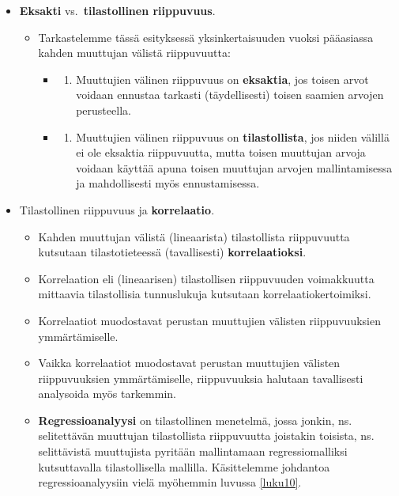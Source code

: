 \documentclass[
]{book}
\providecommand{\tightlist}{%
  \setlength{\itemsep}{0pt}\setlength{\parskip}{0pt}}
\begin{document}
\hfill\break

\begin{itemize}
\tightlist
\item
  \textbf{Eksakti} vs.~\textbf{tilastollinen riippuvuus}.

  \begin{itemize}
  \tightlist
  \item
    Tarkastelemme tässä esityksessä yksinkertaisuuden vuoksi pääasiassa kahden muuttujan välistä riippuvuutta:

    \begin{itemize}
    \item
      \begin{enumerate}
      \def\labelenumi{(\roman{enumi})}
      \tightlist
      \item
        Muuttujien välinen riippuvuus on \textbf{eksaktia}, jos toisen arvot voidaan ennustaa tarkasti (täydellisesti) toisen saamien arvojen perusteella.
      \end{enumerate}
    \item
      \begin{enumerate}
      \def\labelenumi{(\roman{enumi})}
      \setcounter{enumi}{1}
      \tightlist
      \item
        Muuttujien välinen riippuvuus on \textbf{tilastollista}, jos niiden välillä ei ole eksaktia riippuvuutta, mutta toisen muuttujan arvoja voidaan käyttää apuna toisen muuttujan arvojen mallintamisessa ja mahdollisesti myös ennustamisessa.
      \end{enumerate}
    \end{itemize}
  \end{itemize}
\item
  Tilastollinen riippuvuus ja \textbf{korrelaatio}.

  \begin{itemize}
  \tightlist
  \item
    Kahden muuttujan välistä (lineaarista) tilastollista riippuvuutta kutsutaan tilastotieteessä (tavallisesti) \textbf{korrelaatioksi}.
  \item
    Korrelaation eli (lineaarisen) tilastollisen riippuvuuden voimakkuutta mittaavia tilastollisia tunnuslukuja kutsutaan korrelaatiokertoimiksi.
  \item
    Korrelaatiot muodostavat perustan muuttujien välisten riippuvuuksien ymmärtämiselle.
  \item
    Vaikka korrelaatiot muodostavat perustan muuttujien välisten riippuvuuksien ymmärtämiselle, riippuvuuksia halutaan tavallisesti analysoida myös tarkemmin.
  \item
    \textbf{Regressioanalyysi} on tilastollinen menetelmä, jossa jonkin, ns. selitettävän muuttujan tilastollista riippuvuutta joistakin toisista, ns. selittävistä muuttujista pyritään mallintamaan regressiomalliksi kutsuttavalla tilastollisella mallilla. Käsittelemme johdantoa regressioanalyysiin vielä myöhemmin luvussa \ref{luku10}.
  \end{itemize}
\end{itemize}
\end{document}
